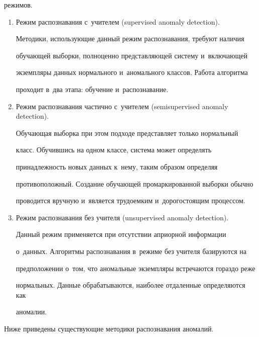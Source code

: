 режимов.


  \begin{enumerate}[1.]


\item  Режим распознавания с~учителем (supervised anomaly detection).


  


  Методики, использующие данный режим распознавания, требуют наличия 


обучающей выборки, полноценно представляющей систему и~включающей 


экземпляры данных нормального и~аномального классов. Работа алгоритма 


проходит в~два этапа: обучение и~распознавание.


  \item Режим распознавания частично с~учителем (semisupervised anomaly detection).


  


  Обучающая выборка при этом подходе представляет только нормальный 


класс. Обучившись на одном классе, система может определять 


принадлежность новых данных к~нему, таким образом определяя 


противоположный. Создание обучающей промаркированной выборки обычно 


проводится вручную и~является трудоемким и~дорогостоящим процессом.


  \item Режим распознавания без учителя (unsupervised anomaly detection).


  


  Данный режим применяется при отсутствии априорной информации 


о~данных. Алгоритмы распознавания в~режиме без учителя базируются на 


предположении о~том, что аномальные экземпляры встречаются гораздо реже 


нормальных. Данные обрабатываются, наиболее отдаленные определяются как 


аномалии.


  \end{enumerate}


  


  Ниже приведены существующие методики распознавания аномалий.


